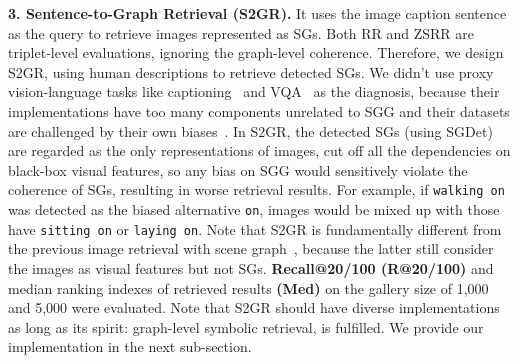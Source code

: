 \documentclass[10pt,twocolumn,letterpaper]{article}
\begin{document}
\noindent\textbf{3. Sentence-to-Graph Retrieval (S2GR).} It uses the image caption sentence as the query to retrieve images represented as SGs. Both RR and ZSRR are triplet-level evaluations, ignoring the graph-level coherence. Therefore, we design S2GR, using human descriptions to retrieve detected SGs. We didn't use proxy vision-language tasks like captioning~\cite{yang2019auto, yao2018exploring} and VQA~\cite{teney2017graph, hudson2019gqa} as the diagnosis, because their implementations have too many components unrelated to SGG and their datasets are challenged by their own biases~\cite{agrawal2018don, hendricks2018women, manjunatha2019explicit}. In S2GR, the detected SGs (using SGDet) are regarded as the only representations of images, cut off all the dependencies on black-box visual features, so any bias on SGG would sensitively violate the coherence of SGs, resulting in worse retrieval results. For example, if \texttt{walking on} was detected as the biased alternative \texttt{on}, images would be mixed up with those have \texttt{sitting on} or \texttt{laying on}. Note that S2GR is fundamentally different from the previous image retrieval with scene graph~\cite{Johnson_2015_CVPR, schuster2015generating}, because the latter still consider the images as visual features but not SGs. \textbf{Recall@20/100 (R@20/100)} and median ranking indexes of retrieved results \textbf{(Med)} on the gallery size of 1,000 and 5,000 were evaluated. Note that S2GR should have diverse implementations as long as its spirit: graph-level symbolic retrieval, is fulfilled. We provide our implementation in the next sub-section.
\end{document}
